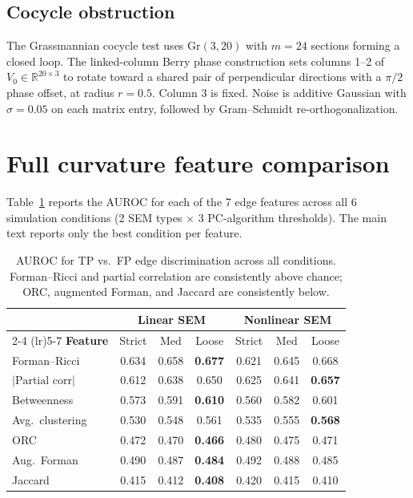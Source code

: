 \documentclass[11pt]{article}
\newcommand{\Gr}{\mathrm{Gr}}
\newcommand{\R}{\mathbb{R}}
\begin{document}
\subsection{Cocycle obstruction}

The Grassmannian cocycle test uses $\Gr(3, 20)$ with $m = 24$ sections forming a closed loop. The linked-column Berry phase construction sets columns 1--2 of $V_0 \in \R^{20 \times 3}$ to rotate toward a shared pair of perpendicular directions with a $\pi/2$ phase offset, at radius $r = 0.5$. Column 3 is fixed. Noise is additive Gaussian with $\sigma = 0.05$ on each matrix entry, followed by Gram--Schmidt re-orthogonalization.

\section{Full curvature feature comparison}
\label{app:curvature}

Table~\ref{tab:curvature-full} reports the AUROC for each of the 7 edge features across all 6 simulation conditions (2 SEM types $\times$ 3 PC-algorithm thresholds). The main text reports only the best condition per feature.

\begin{table}[h]
\centering
\caption{AUROC for TP vs.\ FP edge discrimination across all conditions. Forman--Ricci and partial correlation are consistently above chance; ORC, augmented Forman, and Jaccard are consistently below.}
\label{tab:curvature-full}
\small
\begin{tabular}{@{}lcccccc@{}}
\toprule
& \multicolumn{3}{c}{\textbf{Linear SEM}} & \multicolumn{3}{c}{\textbf{Nonlinear SEM}} \\
\cmidrule(lr){2-4} \cmidrule(lr){5-7}
\textbf{Feature} & Strict & Med & Loose & Strict & Med & Loose \\
\midrule
Forman--Ricci & 0.634 & 0.658 & \textbf{0.677} & 0.621 & 0.645 & 0.668 \\
$|\text{Partial corr}|$ & 0.612 & 0.638 & 0.650 & 0.625 & 0.641 & \textbf{0.657} \\
Betweenness & 0.573 & 0.591 & \textbf{0.610} & 0.560 & 0.582 & 0.601 \\
Avg.\ clustering & 0.530 & 0.548 & 0.561 & 0.535 & 0.555 & \textbf{0.568} \\
\midrule
ORC & 0.472 & 0.470 & \textbf{0.466} & 0.480 & 0.475 & 0.471 \\
Aug.\ Forman & 0.490 & 0.487 & \textbf{0.484} & 0.492 & 0.488 & 0.485 \\
Jaccard & 0.415 & 0.412 & \textbf{0.408} & 0.420 & 0.415 & 0.410 \\
\bottomrule
\end{tabular}
\end{table}
\end{document}
